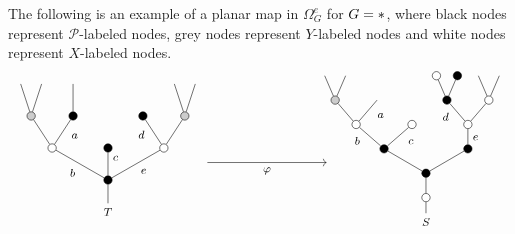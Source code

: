 \documentclass[a4paper,10pt]{article}%
\begin{document}
\begin{example}\label{REGALTERNMAP EX}
The following  is an example of a planar map in $\Omega_G^e$ for $G=\**$, where black nodes represent $\mathcal{P}$-labeled nodes, grey nodes represent $Y$-labeled nodes and white nodes represent $X$-labeled nodes.
\[
\begin{tikzpicture}[grow=up,auto,level distance=2.3em,
every node/.style = {font=\footnotesize},
dummy/.style={circle,draw,inner sep=0pt,minimum size=2.1mm}]
	\tikzstyle{level 2}=[sibling distance = 4em]
	\tikzstyle{level 3}=[sibling distance = 3em]
	\tikzstyle{level 4}=[sibling distance = 1.5em]
	\node at (0,0.25) {$T$}
		child{node [dummy,fill = black] {}
			child{node [dummy,fill=white] {}
				child{node [dummy,fill = black!20] {}
					child
					child
				}
				child{node [dummy,fill = black] {}
				edge from parent node [near end] {$d$}}
			edge from parent node [swap] {$e$}}
			child{node [dummy,fill=black] {}
			edge from parent node [swap, near end] {$c$}}
			child{node [dummy,fill=white] {}
				child{node [dummy,fill = black] {}
					child
				edge from parent node [swap, near end] {$a\phantom{d}$}}
				child{node [dummy,fill = black!20] {}
					child
					child
				}
			edge from parent node {$b$}}
		};
\begin{scope}[level distance=1.75em]
	\tikzstyle{level 3}=[sibling distance = 6em]
	\tikzstyle{level 4}=[sibling distance = 4em]
	\tikzstyle{level 5}=[sibling distance = 3em]
	\tikzstyle{level 6}=[sibling distance = 1.5em]
	\tikzstyle{level 7}=[sibling distance = 0.75em]
	\node at (8,0) {$S$}
		child{node [dummy,fill = white] {}
			child{node [dummy,fill = black] {}
				child{node [dummy,fill = black] {}
					child{node [dummy,fill=white] {}
						child{node [dummy,fill = white] {}
							child
							child
						}
						child{node [dummy,fill = black] {}
							child{node [dummy,fill=black] {}
						}
							child{node [dummy,fill=white] {}}
						edge from parent node [near end] {$d$}}
					edge from parent node [swap] {$e\phantom{1}$}}
				}
				child{node [dummy,fill = black] {}
					child{node [dummy,fill=white] {}
					edge from parent node [swap, near end] {$c\phantom{1}$}}
					child{node [dummy,fill=white] {}
						child{
						edge from parent node [swap,near end] {$a\phantom{d}$}}
						child{node [dummy,fill = black!20] {}
							child
							child
						}
					edge from parent node [near end] {$\phantom{1}b$}}
				}
			}
		};
\end{scope}
	\draw [->] (2.5,1.5) -- node [swap] {$\varphi$} (5.5,1.5);
\end{tikzpicture}
\]
\end{example}
\end{document}
